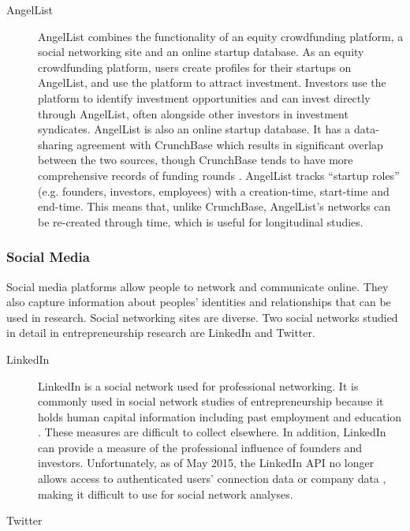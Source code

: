 \documentclass[../thesis/thesis.tex]{subfiles}
\begin{document}
\begin{refsection}
\begin{description}
\item[AngelList]

AngelList combines the functionality of an equity crowdfunding platform, a social networking site and an online startup database. As an equity crowdfunding platform, users create profiles for their startups on AngelList, and use the platform to attract investment. Investors use the platform to identify investment opportunities and can invest directly through AngelList, often alongside other investors in investment syndicates. AngelList is also an online startup database. It has a data-sharing agreement with CrunchBase which results in significant overlap between the two sources, though CrunchBase tends to have more comprehensive records of funding rounds \cite{cheng2016}. AngelList tracks ``startup roles'' (e.g. founders, investors, employees) with a creation-time, start-time and end-time. This means that, unlike CrunchBase, AngelList's networks can be re-created through time, which is useful for longitudinal studies.

\end{description}

\subsubsection{Social Media}

Social media platforms allow people to network and communicate online. They also capture information about peoples' identities and relationships that can be used in research. Social networking sites are diverse. Two social networks studied in detail in entrepreneurship research are LinkedIn and Twitter.

\begin{description}

\item[LinkedIn]

LinkedIn is a social network used for professional networking. It is commonly used in social network studies of entrepreneurship because it holds human capital information including past employment and education \cite{song2012}. These measures are difficult to collect elsewhere. In addition, LinkedIn can provide a measure of the professional influence of founders and investors. Unfortunately, as of May 2015, the LinkedIn API no longer allows access to authenticated users' connection data or company data \cite{trachtenberg2015}, making it difficult to use for social network analyses.

\item[Twitter]


\end{description}
\end{refsection}
\end{document}
